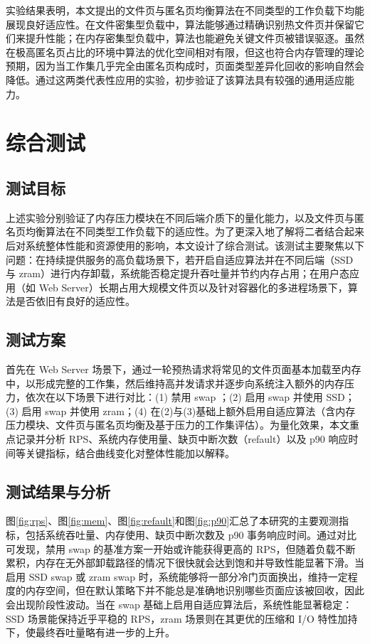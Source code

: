 实验结果表明，本文提出的文件页与匿名页均衡算法在不同类型的工作负载下均能展现良好适应性。在文件密集型负载中，算法能够通过精确识别热文件页并保留它们来提升性能；在内存密集型负载中，算法也能避免关键文件页被错误驱逐。虽然在极高匿名页占比的环境中算法的优化空间相对有限，但这也符合内存管理的理论预期，因为当工作集几乎完全由匿名页构成时，页面类型差异化回收的影响自然会降低。通过这两类代表性应用的实验，初步验证了该算法具有较强的通用适应能力。

\section{综合测试}

\subsection{测试目标}

上述实验分别验证了内存压力模块在不同后端介质下的量化能力，以及文件页与匿名页均衡算法在不同类型工作负载下的适应性。为了更深入地了解将二者结合起来后对系统整体性能和资源使用的影响，本文设计了综合测试。该测试主要聚焦以下问题：在持续提供服务的高负载场景下，若开启自适应算法并在不同后端（SSD 与 zram）进行内存卸载，系统能否稳定提升吞吐量并节约内存占用；在用户态应用（如 Web Server）长期占用大规模文件页以及针对容器化的多进程场景下，算法是否依旧有良好的适应性。

\subsection{测试方案}

首先在 Web Server 场景下，通过一轮预热请求将常见的文件页面基本加载至内存中，以形成完整的工作集，然后维持高并发请求并逐步向系统注入额外的内存压力，依次在以下场景下进行对比：(1) 禁用  swap ；(2) 启用  swap  并使用 SSD；(3) 启用  swap  并使用 zram；(4) 在(2)与(3)基础上额外启用自适应算法（含内存压力模块、文件页与匿名页均衡及基于压力的工作集评估）。为量化效果，本文重点记录并分析 RPS、系统内存使用量、缺页中断次数（refault）以及 p90 响应时间等关键指标，结合曲线变化对整体性能加以解释。

\subsection{测试结果与分析}
\label{sec:test_result}

图\ref{fig:rps}、图\ref{fig:mem}、图\ref{fig:refault}和图\ref{fig:p90}汇总了本研究的主要观测指标，包括系统吞吐量、内存使用、缺页中断次数及 p90 事务响应时间。通过对比可发现，禁用  swap  的基准方案一开始或许能获得更高的 RPS，但随着负载不断累积，内存在无外部卸载路径的情况下很快就会达到饱和并导致性能显著下滑。当启用 SSD  swap  或 zram  swap  时，系统能够将一部分冷门页面换出，维持一定程度的内存空间，但在默认策略下并不能总是准确地识别哪些页面应该被回收，因此会出现阶段性波动。当在  swap  基础上启用自适应算法后，系统性能显著稳定：SSD 场景能保持近乎平稳的 RPS，zram 场景则在其更优的压缩和 I/O 特性加持下，使最终吞吐量略有进一步的上升。

